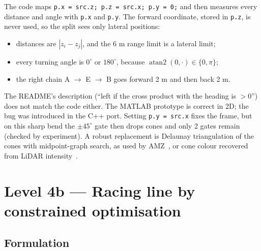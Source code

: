 \documentclass[10pt,a4paper]{scrartcl}
\renewcommand{\emph}[1]{\textcolor{accent}{#1}}
\newcommand{\code}[1]{\texttt{#1}}
\DeclareMathOperator{\atantwo}{atan2}
\newcommand{\RuleSection}[1]{%
    \section{#1}%
    \vspace{0.2em}{\color{accent!35}\hrule height 0.4pt}\vspace{0.3em}%
  }
\begin{document}
  \begin{warnbox}
  \small
  The code maps \code{p.x = src.z; p.z = src.x; p.y = 0;} and then measures every
  distance and angle with \code{p.x} and \code{p.y}. The forward coordinate, stored in
  \code{p.z}, is never used, so the split sees only lateral positions:
  \begin{itemize}
    \item distances are $|z_i-z_j|$, and the 6 m range limit is a \emph{lateral} limit;
    \item every turning angle is $0^\circ$ or $180^\circ$, because $\atantwo(0,\cdot)\in\{0,\pi\}$;
    \item the right chain A $\to$ E $\to$ B goes forward 2 m and then back 2 m.
  \end{itemize}
  The README's description (``left if the cross product with the heading is $>0$'')
  does not match the code either. The MATLAB prototype is correct in 2D; the bug was
  introduced in the C++ port. Setting \code{p.y = src.x} fixes the frame, but on this
  sharp bend the $\pm45^\circ$ gate then drops cones and only 2 gates remain (checked by
  experiment). A robust replacement is Delaunay triangulation of the cones with
  midpoint-graph search, as used by AMZ~\citep{kabzan2020amz}, or cone colour
  recovered from LiDAR intensity~\citep{gosala2019redundant}.
  \end{warnbox}

  \RuleSection{Level 4b --- Racing line by constrained optimisation}
  \label{sec:l4b}

  \subsection{Formulation}
\end{document}
